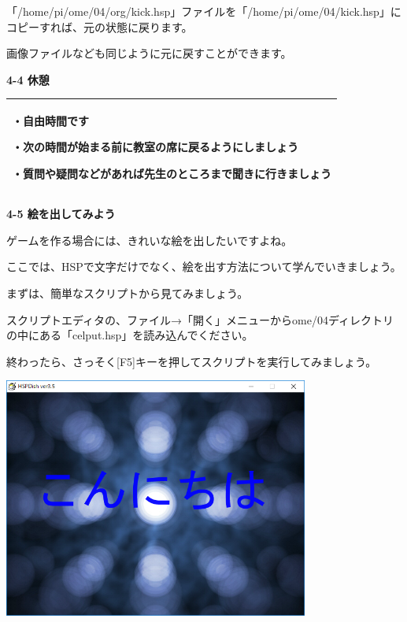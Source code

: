 \documentclass[a4paper,dvipdfmx]{jarticle}
\begin{document}
「/home/pi/ome/04/org/kick.hsp」ファイルを「/home/pi/ome/04/kick.hsp」にコピーすれば、元の状態に戻ります。

画像ファイルなども同じように元に戻すことができます。


\bigskip


\bigskip

{\bfseries
4-4 休憩}


\bigskip

\begin{flushleft}
\tablefirsthead{}
\tablehead{}
\tabletail{}
\tablelasttail{}
\begin{supertabular}{|m{10.733cm}|}
\hline
・自由時間です

・次の時間が始まる前に教室の席に戻るようにしましょう

・質問や疑問などがあれば先生のところまで聞きに行きましょう\\\hline
\end{supertabular}
\end{flushleft}
\clearpage
\bigskip

{\bfseries
4-5 絵を出してみよう}


\bigskip

ゲームを作る場合には、きれいな絵を出したいですよね。

ここでは、HSPで文字だけでなく、絵を出す方法について学んでいきましょう。


\bigskip

まずは、簡単なスクリプトから見てみましょう。

スクリプトエディタの、ファイル→「開く」メニューからome/04ディレクトリの中にある「celput.hsp」を読み込んでください。

終わったら、さっそく[F5]キーを押してスクリプトを実行してみましょう。


\bigskip



\begin{center}
\includegraphics[width=10.028cm,height=7.909cm]{text04-img/text04-img012.png}

\end{center}
\end{document}

